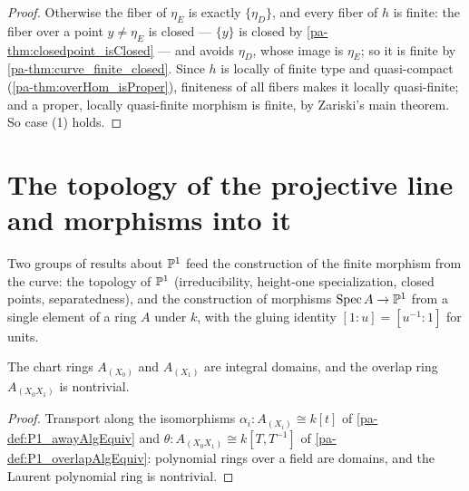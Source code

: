 \begin{proof}
  Otherwise the fiber of \(\eta_E\) is exactly \(\{\eta_D\}\), and every fiber of
  \(h\) is finite: the fiber over a point \(y \neq \eta_E\) is closed --- \(\{y\}\) is
  closed by \ref{pa-thm:closedpoint_isClosed} --- and avoids \(\eta_D\), whose image is
  \(\eta_E\); so it is finite by \ref{pa-thm:curve_finite_closed}. Since \(h\) is locally
  of finite type and quasi-compact (\ref{pa-thm:overHom_isProper}), finiteness of all
  fibers makes it locally quasi-finite; and a proper, locally quasi-finite morphism is
  finite, by Zariski's main theorem. So case (1) holds.
\end{proof}

\section{The topology of the projective line and morphisms into it}

Two groups of results about \(\mathbb{P}^1\) feed the construction of the finite morphism from
the curve: the topology of \(\mathbb{P}^1\) (irreducibility, height-one specialization, closed
points, separatedness), and the construction of morphisms \(\operatorname{Spec} A \to \mathbb{P}^1\) from a
single element of a ring \(A\) under \(k\), with the gluing identity
\([1 : u] = [u^{-1} : 1]\) for units.

\begin{lemma}
  \label{pa-lem:P1_away_domains}
  \leanok

  The chart rings \(A_{(X_0)}\) and \(A_{(X_1)}\) are integral domains, and the overlap
  ring \(A_{(X_0X_1)}\) is nontrivial.
\end{lemma}
\begin{proof}
  \leanok
  Transport along the isomorphisms \(\alpha_i : A_{(X_i)} \cong k[t]\) of
  \ref{pa-def:P1_awayAlgEquiv} and \(\theta : A_{(X_0X_1)} \cong k[T,T^{-1}]\) of
  \ref{pa-def:P1_overlapAlgEquiv}: polynomial rings over a field are domains, and the Laurent
  polynomial ring is nontrivial.
\end{proof}

